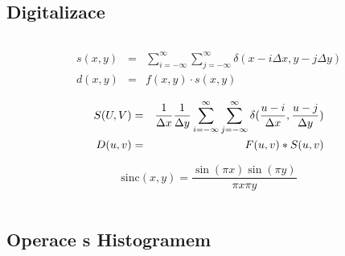 \subsection{Digitalizace}

\begin{equation}
\end{equation}



\begin{eqnarray}
s(x,y)&=&\sum\limits_{i=-\infty}^\infty\sum\limits_{j=-\infty}^\infty\delta(x-i\Delta x,y-j\Delta y)\\
d(x,y)&=&f(x,y)\cdot s(x,y)
\end{eqnarray}

\begin{eqnarray}
S(U,V)&=&\frac{1}{\Delta x}\frac{1}{\Delta y}\sum\limits_{i=-\infty}^\infty\sum\limits_{j=-\infty}^\infty
\delta(\frac{u-i}{\Delta x},\frac{u-j}{\Delta y})\\
D(u,v)&=&F(u,v)\ast S(u,v)\label{shannon}
\end{eqnarray}


\begin{itemize}
\end{itemize}

 
\begin{equation}
\mathrm{sinc}(x,y)=\frac{\sin(\pi x)\sin(\pi y)}{\pi x \pi y}
\end{equation}


\begin{enumerate}
\end{enumerate}



\begin{itemize}
\end{itemize}



\medskip

\begin{tabular}{ll}
\end{tabular}

\medskip

\subsection{Operace s Histogramem}

\begin{description}
\end{description} 



\begin{enumerate}
\end{enumerate}

